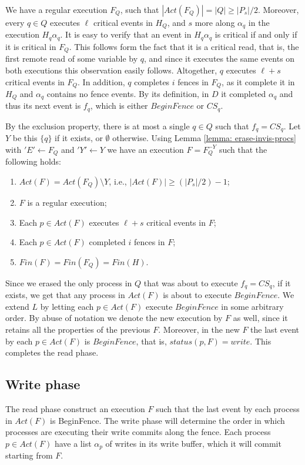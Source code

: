 We have a regular execution $F_Q$, such that $|Act(F_Q)| = |Q| \geq |P_s|/2$. Moreover, every $q \in Q$ executes $\ell$ critical events in $H_Q$, and $s$ more along $\alpha_q$ in the execution $H_q \alpha_q$. It is easy to verify that an event in $H_q \alpha_q$ is critical if and only if it is critical in $F_Q$. This follows form the fact that it is a critical read, that is, the first remote read of some variable by $q$, and since it executes the same events on both executions this observation easily follows. Altogether, $q$ executes $\ell+s$ critical events in $F_Q$. In addition, $q$ completes $i$ fences in $F_Q$, as it complete it in $H_Q$ and $\alpha_q$ contains no fence events. By its definition, in $D$ it completed $\alpha_q$ and thus its next event is $f_q$, which is either $BeginFence$ or $CS_q$.

By the exclusion property, there is at most a single $q \in Q$ such that $f_q = CS_q$. Let $Y$ be this $\{q\}$ if it exists, or $\emptyset$ otherwise. Using Lemma \ref{lemma: erase-invis-procs} with $'E' \leftarrow F_Q$ and $'Y'\leftarrow Y$ we have an execution $F = F_Q^{-Y}$ such that the following holds:
\begin{enumerate}[(1)]
	\item $Act(F) = Act(F_Q) \setminus Y$, i.e., $|Act(F)| \geq (|P_s|/2)-1$;
	\item $F$ is a regular execution;
	\item Each $p \in Act(F)$ executes $\ell+s$ critical events in $F$;
	\item Each $p \in Act(F)$ completed $i$ fences in $F$;
	\item $Fin(F) = Fin(F_Q) = Fin(H)$.
\end{enumerate}

Since we erased the only process in $Q$ that was about to execute $f_q = CS_q$, if it exists, we get that any process in $Act(F)$ is about to execute $BeginFence$. We extend $L$ by letting each $p \in Act(F)$ execute $BeginFence$ in some arbitrary order. By abuse of notation we denote the new execution by $F$ as well, since it retains all the properties of the previous $F$. Moreover, in the new $F$ the last event by each $p \in Act(F)$ is $BeginFence$, that is, $status(p,F) = write$. This completes the read phase.






\newpage
\subsection{Write phase}
The read phase construct an execution $F$ such that the last event by each process in $Act(F)$ is BeginFence. The write phase will determine the order in which processes are executing their write commits along the fence. Each process $p \in Act(F)$ have a list $\alpha_p$ of writes in its write buffer, which it will commit starting from $F$.

